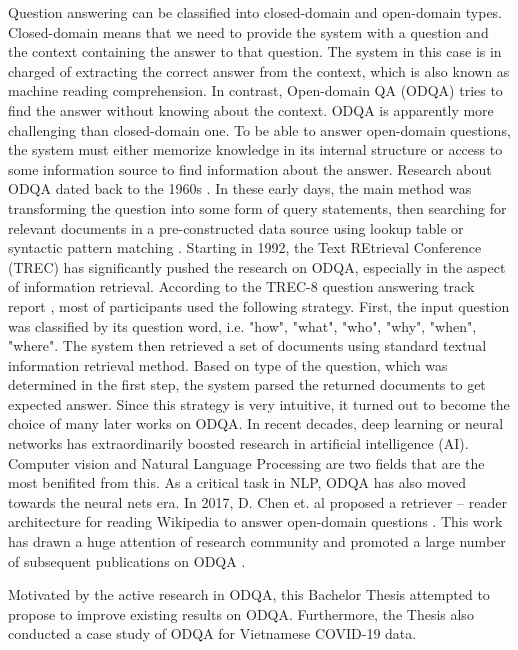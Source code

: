 \documentclass[12pt, sort&compress]{report}
\begin{document}
\par Question answering can be classified into closed-domain and open-domain types. Closed-domain means that we need to provide the system with a question and the context containing the answer to that question. The system in this case is in charged of extracting the correct answer from the context, which is also known as machine reading comprehension. In contrast, Open-domain QA (ODQA) tries to find the answer without knowing about the context. ODQA is apparently more challenging than closed-domain one. To be able to answer open-domain questions, the system must either memorize knowledge in its internal structure or access to some information source to find information about the answer. Research about ODQA dated back to the 1960s \cite{green1961baseball}. In these early days, the main method was transforming the question into some form of query statements, then searching for relevant documents in a pre-constructed data source using lookup table \cite{green1961baseball} or syntactic pattern matching \cite{kupiec1993murax}. Starting in 1992, the Text REtrieval Conference (TREC) has significantly pushed the research on ODQA, especially in the aspect of information retrieval. According to the TREC-8 question answering track report \cite{voorhees1999trec}, most of participants used the following strategy. First, the input question was classified by its question word, i.e. "how", "what", "who", "why", "when", "where". The system then retrieved a set of documents using standard textual information retrieval method. Based on type of the question, which was determined in the first step, the system parsed the returned documents to get expected answer. Since this strategy is very intuitive, it turned out to become the choice of many later works on ODQA. In recent decades, deep learning or neural networks has extraordinarily boosted research in artificial intelligence (AI). Computer vision and Natural Language Processing are two fields that are the most benifited from this. As a critical task in NLP, ODQA has also moved towards the neural nets era. In 2017, D. Chen et. al proposed a retriever – reader architecture for reading Wikipedia to answer open-domain questions \cite{chen2017reading}. This work has drawn a huge attention of research community and promoted a large number of subsequent publications on ODQA \cite{wang2017rtheta3,asai2019learning,lee2019latent,min2019discrete,min2019knowledge,seo2019real,wang2019multi,guu2020realm,izacard2020leveraging,karpukhin2020dense,lewis2020retrieval,mao2020generation,min2020ambigqa,roberts2020much,xiong2020progressively,mao2021reader}. 
\par Motivated by the active research in ODQA, this Bachelor Thesis attempted to propose to improve existing results on ODQA. Furthermore, the Thesis also conducted a case study of ODQA for Vietnamese COVID-19 data.
\end{document}
